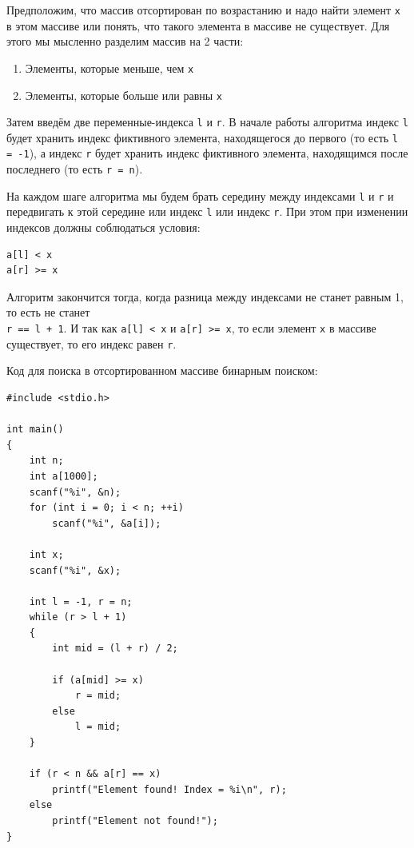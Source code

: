 \documentclass{article}
\begin{document}
Предположим, что массив отсортирован по возрастанию и надо найти элемент \texttt{x} в этом массиве или понять, что такого элемента в массиве не существует. Для этого мы мысленно разделим массив на  2 части:
\begin{enumerate}
\item Элементы, которые меньше, чем \texttt{x}
\item Элементы, которые больше или равны \texttt{x}
\end{enumerate}

Затем введём две переменные-индекса \texttt{l} и \texttt{r}. В начале работы алгоритма индекс \texttt{l} будет хранить индекс фиктивного элемента, находящегося до первого (то есть \texttt{l = -1}), а индекс \texttt{r} будет хранить индекс фиктивного элемента, находящимся после последнего (то есть \texttt{r = n}). 

На каждом шаге алгоритма мы будем брать середину между индексами \texttt{l} и \texttt{r} и передвигать к этой середине или индекс \texttt{l} или индекс \texttt{r}. При этом при изменении индексов должны соблюдаться условия:
\begin{verbatim}
a[l] < x
a[r] >= x
\end{verbatim}

Алгоритм закончится тогда, когда разница между индексами не станет равным 1, то есть не станет \\
\texttt{r == l + 1}. И так как \texttt{a[l] < x} и \texttt{a[r] >= x}, то если элемент \texttt{x} в массиве существует, то его индекс равен \texttt{r}.



Код для поиска в отсортированном массиве бинарным поиском:
\begin{lstlisting}
#include <stdio.h>

int main() 
{
    int n;
    int a[1000];
    scanf("%i", &n);
    for (int i = 0; i < n; ++i)
        scanf("%i", &a[i]);
        
    int x;
    scanf("%i", &x);
    
    int l = -1, r = n;
    while (r > l + 1) 
    {
        int mid = (l + r) / 2;
        
        if (a[mid] >= x)
            r = mid;
        else 
            l = mid;
    }
    
    if (r < n && a[r] == x)
        printf("Element found! Index = %i\n", r);
    else
        printf("Element not found!");
}

\end{lstlisting}
\end{document}
